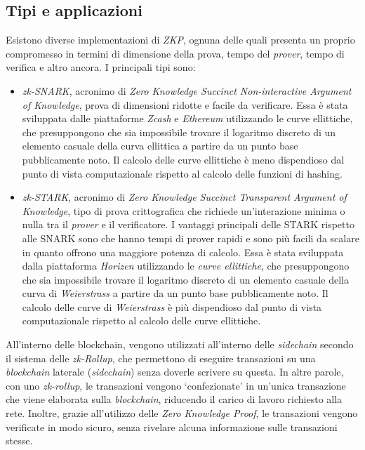 \subsection{Tipi e applicazioni}\label{sec:zero-knowledge-proof-tipi-applicazioni}
Esistono diverse implementazioni di \textit{ZKP}, ognuna delle quali presenta un proprio compromesso in termini di dimensione della prova, tempo del \textit{prover}, tempo di verifica e altro ancora. 
I principali tipi sono: 
\begin{itemize}
    \item{\textit{zk-SNARK}}, acronimo di \textit{Zero Knowledge Succinct Non-interactive Argument of Knowledge}, prova di dimensioni ridotte e facile da verificare. Essa è stata sviluppata dalle piattaforme \textit{Zcash} e \textit{Ethereum} 
    utilizzando le curve ellittiche, che presuppongono che sia impossibile trovare il logaritmo discreto di un elemento casuale della curva ellittica a partire da un punto base pubblicamente noto. Il calcolo delle curve ellittiche è meno dispendioso dal punto di vista computazionale rispetto al calcolo delle funzioni di hashing.
    \item{\textit{zk-STARK}}, acronimo di \textit{Zero Knowledge Succinct Transparent Argument of Knowledge}, tipo di prova crittografica che richiede un'interazione minima o nulla tra il \textit{prover} e il verificatore. I vantaggi principali delle STARK rispetto alle SNARK sono che hanno tempi di prover rapidi e sono più facili da scalare in quanto offrono una maggiore potenza di calcolo.
    Essa è stata sviluppata dalla piattaforma \textit{Horizen} utilizzando le \textit{curve ellittiche}, che presuppongono che sia impossibile trovare il logaritmo discreto di un elemento casuale della curva di \textit{Weierstrass} a partire da un punto base pubblicamente noto. Il calcolo delle curve di \textit{Weierstrass} è più dispendioso dal punto di vista computazionale rispetto al calcolo delle curve ellittiche.
\end{itemize}

All'interno delle blockchain, vengono utilizzati all'interno delle \textit{sidechain} secondo il sistema delle \textit{zk-Rollup}, che permettono di eseguire transazioni su una \textit{blockchain} laterale (\textit{sidechain}) senza doverle scrivere su questa.
In altre parole, con uno \textit{zk-rollup}, le transazioni vengono `confezionate' in un'unica transazione che viene elaborata sulla \textit{blockchain}, riducendo il carico di lavoro richiesto alla rete. 
Inoltre, grazie all'utilizzo delle \textit{Zero Knowledge Proof}, le transazioni vengono verificate in modo sicuro, senza rivelare alcuna informazione sulle transazioni stesse.
 
